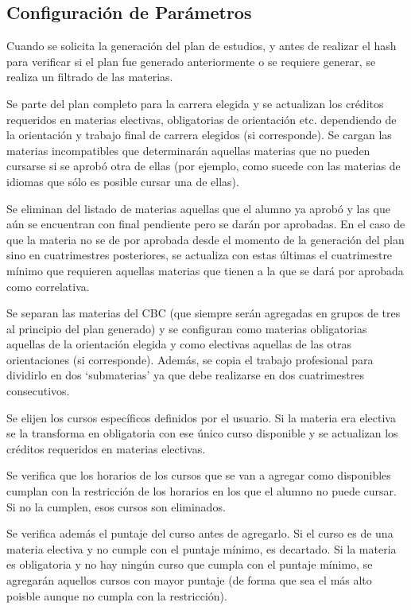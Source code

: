 \documentclass[a4paper]{article}
\begin{document}
\subsection{Configuración de Parámetros}
Cuando se solicita la generación del plan de estudios, y antes de realizar el hash para verificar si el plan fue generado anteriormente o se requiere generar, se realiza un filtrado de las materias.

Se parte del plan completo para la carrera elegida y se actualizan los créditos requeridos en materias electivas, obligatorias de orientación etc. dependiendo de la orientación y trabajo final de carrera elegidos (si corresponde). Se cargan las materias incompatibles que determinarán aquellas materias que no pueden cursarse si se aprobó otra de ellas (por ejemplo, como sucede con las materias de idiomas que sólo es posible cursar una de ellas).

Se eliminan del listado de materias aquellas que el alumno ya aprobó y las que aún se encuentran con final pendiente pero se darán por aprobadas. En el caso de que la materia no se de por aprobada desde el momento de la generación del plan sino en cuatrimestres posteriores, se actualiza con estas últimas el cuatrimestre mínimo que requieren aquellas materias que tienen a la que se dará por aprobada como correlativa.

Se separan las materias del CBC (que siempre serán agregadas en grupos de tres al principio del plan generado) y se configuran como materias obligatorias aquellas de la orientación elegida y como electivas aquellas de las otras orientaciones (si corresponde). Además, se copia el trabajo profesional para dividirlo en dos `submaterias' ya que debe realizarse en dos cuatrimestres consecutivos.

Se elijen los cursos específicos definidos por el usuario. Si la materia era electiva se la transforma en obligatoria con ese único curso disponible y se actualizan los créditos requeridos en materias electivas.

Se verifica que los horarios de los cursos que se van a agregar como disponibles cumplan con la restricción de los horarios en los que el alumno no puede cursar. Si no la cumplen, esos cursos son eliminados.

Se verifica además el puntaje del curso antes de agregarlo. Si el curso es de una materia electiva y no cumple con el puntaje mínimo, es decartado. Si la materia es obligatoria y no hay ningún curso que cumpla con el puntaje mínimo, se agregarán aquellos cursos con mayor puntaje (de forma que sea el más alto poisble aunque no cumpla con la restricción).
\end{document}

